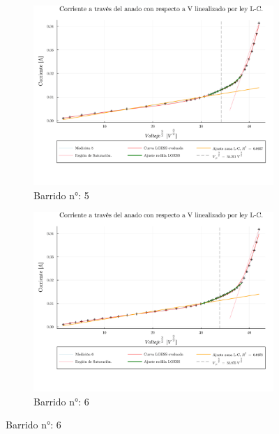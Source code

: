 \begin{figure}[H]
	\ContinuedFloat %
	\centering
	\begin{subfigure}[b]{0.49\textwidth}
		\centering
		\includegraphics[width=\linewidth]{img/pot5.png}
		\caption{Barrido n°: 5}
		\label{fig:pot5}
	\end{subfigure}
	\hfill
	\begin{subfigure}[b]{0.49\textwidth}
		\centering
		\includegraphics[width=\linewidth]{img/pot6.png}
		\caption{Barrido n°: 6}
		\label{fig:pot6}
	\end{subfigure}
	
\end{figure}

